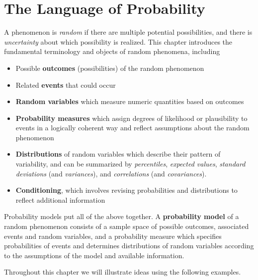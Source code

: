 \documentclass[
  letterpaper,
  DIV=11,
  numbers=noendperiod]{scrreprt}
\providecommand{\tightlist}{%
  \setlength{\itemsep}{0pt}\setlength{\parskip}{0pt}}
\theoremstyle{plain}
\theoremstyle{definition}
\theoremstyle{definition}
\theoremstyle{definition}
\theoremstyle{remark}
\begin{document}

\chapter{The Language of Probability}\label{sec-language-probability}

A phenomenon is \emph{random} if there are multiple potential
possibilities, and there is \emph{uncertainty} about which possibility
is realized. This chapter introduces the fundamental terminology and
objects of random phenomena, including

\begin{itemize}
\tightlist
\item
  Possible \textbf{outcomes} (possibilities) of the random phenomenon
\item
  Related \textbf{events} that could occur
\item
  \textbf{Random variables} which measure numeric quantities based on
  outcomes
\item
  \textbf{Probability measures} which assign degrees of likelihood or
  plausibility to events in a logically coherent way and reflect
  assumptions about the random phenomenon
\item
  \textbf{Distributions} of random variables which describe their
  pattern of variability, and can be summarized by \emph{percentiles},
  \emph{expected values}, \emph{standard deviations} (and
  \emph{variances}), and \emph{correlations} (and \emph{covariances}).
\item
  \textbf{Conditioning}, which involves revising probabilities and
  distributions to reflect additional information
\end{itemize}

Probability models put all of the above together. A \textbf{probability
model} of a random phenomenon consists of a
sample space of possible outcomes, associated events and random
variables, and a probability measure which specifies probabilities of
events and determines distributions of random variables according to the
assumptions of the model and available information.

Throughout this chapter we will illustrate ideas using the following
examples.
\end{document}
